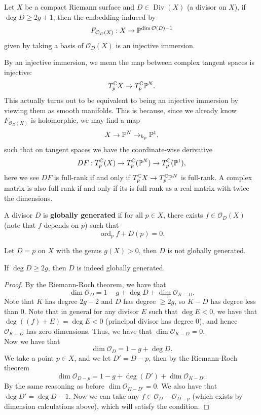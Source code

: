 \documentclass{article}
\begin{document}
{\begin{theorem}
    Let $X$ be a compact Riemann surface and $D \in \operatorname{Div}(X)$ (a divisor on $X$), if $\deg D \geq 2g + 1$, then the embedding induced by
    \[F_{\mathcal{O}_D(X)}:  X \to \mathbb{P}^{\dim \mathcal{O}(D) - 1}\]
    given by taking a basis of $\mathcal{O}_D(X)$ is an injective immersion.
\end{theorem}
By an injective immersion, we mean the map between complex tangent spaces is injective:
    \[T^{\mathbb{C}}_p X \to T^{\mathbb{C}}_p \mathbb{P}^N.\]
    This actually turns out to be equivalent to being an injective immersion by viewing them as smooth manifolds. This is because, since we already know $F_{\mathcal{O}_D(X)}$ is holomorphic, we may find a map
    \[X \to \mathbb{P}^N \to_{h_p} \mathbb{P}^1,\]
    such that on tangent spaces we have the coordinate-wise derivative 
    \[DF: T_p^{\mathbb{C}}(X) \to T^{\mathbb{C}}_p(\mathbb{P}^N) \to T^{\mathbb{C}}_p(\mathbb{P}^1),\]
    here we see $DF$ is full-rank if and only if $T^{\mathbb{C}}_p X \to T^{\mathbb{C}}_p \mathbb{P}^N$ is full-rank. A complex matrix is also full rank if and only if its is full rank as a real matrix with twice the dimensions.

\begin{definition}
    A divisor $D$ is \textbf{globally generated} if for all $p \in X$, there exists $f \in \mathcal{O}_D(X)$ (note that $f$ depends on $p$) such that
    \[\operatorname{ord}_p f + D(p) = 0.\]
\end{definition}

\begin{example}
    Let $D = p$ on $X$ with the genus $g(X) > 0$, then $D$ is not globally generated.
\end{example}

\begin{lemma}
    If $\deg D \geq 2g$, then $D$ is indeed globally generated.
\end{lemma}

\begin{proof}
    By the Riemann-Roch theorem, we have that
    \[\dim \mathcal{O}_D = 1 - g + \deg D + \dim \mathcal{O}_{K-D}.\]
    Note that $K$ has degree $2g - 2$ and $D$ has degree $\geq 2g$, so $K-D$ has degree less than $0$. Note that in general for any divisor $E$ such that $\deg E < 0$, we have that $\deg ((f) + E) = \deg E < 0$ (principal divisor has degree $0$), and hence $\mathcal{O}_{K-D}$ has zero dimensions. Thus, we have that $\dim \mathcal{O}_{K-D} = 0$.\\

    Now we have that
    \[\dim \mathcal{O}_D = 1 - g + \deg D.\]
    We take a point $p \in X$, and we let $D' = D - p$, then by the Riemann-Roch theorem
    \[\dim \mathcal{O}_{D - p} = 1 - g + \deg (D') + \dim \mathcal{O}_{K-D'}.\]
    By the same reasoning as before $\dim \mathcal{O}_{K-D'} = 0$. We also have that $\deg D' = \deg D - 1$. Now we can take any $f \in \mathcal{O}_D - \mathcal{O}_{D - p}$ (which exists by dimension calculations above), which will satisfy the condition.
\end{proof}

}
\end{document}
